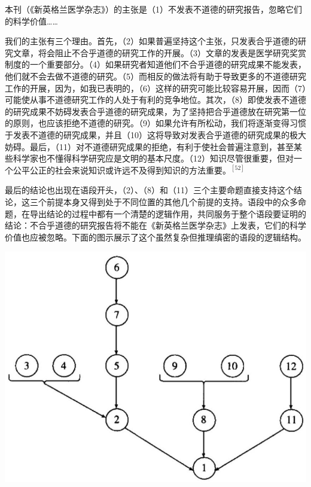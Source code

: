 \begin{displayquote}
本刊（《新英格兰医学杂志》）的主张是（1）不发表不道德的研究报告，忽略它们的料学价值……

我们的主张有三个理由。首先，（2）如果普遍坚持这个主张，只发表合乎道德的研究文章，将会阻止不合乎道德的研究工作的开展。（3）文章的发表是医学研究奖赏制度的一个重要部分。（4）如果研究者知道他们不合乎道德的研究成果不能发表，他们就不会去做不道德的研究。（5）而相反的做法将有助于导致更多的不道德研究工作的开展，因为，如我已表明的，（6）这样的研究可能比较容易开展，因而（7）可能使从事不道德研究工作的人处于有利的竞争地位。其次，（8）即使发表不道德的研究成果不妨碍发表合乎道德的研究成果，为了坚持把合乎道德放在研究第一位的原则，也应该拒绝不道德的研究。（9）如果允许有所松动，我们将逐渐变得习惯于发表不道德的研究成果，并且（10）这将导致对发表合乎道德的研究成果的极大妨碍。最后，（11）对不道德研究成果的拒绝，有利于使社会普遍注意到，甚至某些科学家也不懂得科学研究应是文明的基本尺度。（12）知识尽管很重要，但对一个公平公正的社会来说知识或许远不及得到知识的方法重要。$^{[52]}$
\end{displayquote}

最后的结论也出现在语段开头，（2）、（8）和（11）三个主要命题直接支持这个结论，这三个前提本身又得到处于不同位置的其他几个前提的支持。语段中的众多命题，在导出结论的过程中都有一个清楚的逻辑作用，共同服务于整个语段要证明的结论：不合乎道德的研究报告将不能在《新英格兰医学杂志》上发表，它们的科学价值也应被忽略。下面的图示展示了这个虽然复杂但推理缜密的语段的逻辑结构。

\begin{center}
\includegraphics[width=\textwidth]{images/2025_05_15_6a28331d5e7c993ad07ag-076.jpg}
\end{center}

